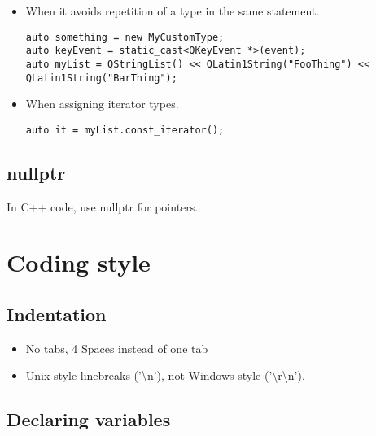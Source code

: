 \documentclass[a4paper,12pt]{article}
\begin{document}
\begin{itemize}
\item When it avoids repetition of a type in the same statement.
\begin{lstlisting}[breaklines]
auto something = new MyCustomType;
auto keyEvent = static_cast<QKeyEvent *>(event);
auto myList = QStringList() << QLatin1String("FooThing") << QLatin1String("BarThing");
 \end{lstlisting}
\item When assigning iterator types.
\begin{lstlisting}[breaklines]
auto it = myList.const_iterator();
 \end{lstlisting}
\end{itemize}

\subsection{nullptr}
In C++ code, use nullptr for pointers. 

\clearpage
\newpage

\section{Coding style}\label{sec:code_conventions}
\subsection{Indentation}
\begin{itemize}
\item No tabs, 4 Spaces instead of one tab
\item Unix-style linebreaks ('\textbackslash n'), not Windows-style ('\textbackslash r\textbackslash n').
\end{itemize}


\subsection{Declaring variables}
\end{document}
